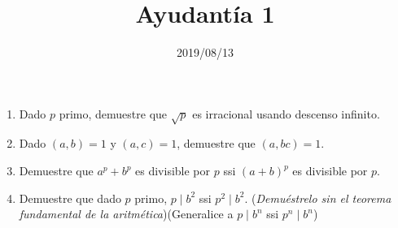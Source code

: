 \documentclass{ayudantia}
\title{Ayudantía 1}
\date{2019/08/13}
\begin{document}
\maketitle
\begin{enumerate}
    \item Dado \(p\) primo, demuestre que \(\sqrt{p}\) es irracional usando descenso infinito.
    \item Dado \((a,b)=1\) y \((a,c)=1\), demuestre que \((a,bc)=1\).
    \item Demuestre que \(a^p+b^p\) es divisible por \(p\) ssi \((a+b)^p\) es divisible por \(p\).
    \item Demuestre que dado \(p\) primo, \(p\mid b^2\) ssi \(p^2\mid b^2\). (\textit{Demuéstrelo sin el teorema fundamental de la aritmética})(Generalice a \(p\mid b^n\) ssi \(p^n\mid b^n\))
\end{enumerate}
\end{document}
